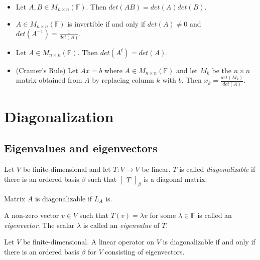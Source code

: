\documentclass[12pt]{article}
\newenvironment{theorem}[2][Theorem]{\begin{trivlist}
\item[\hskip \labelsep {\bfseries #1}\hskip \labelsep {\bfseries #2.}]}{\end{trivlist}}
\newenvironment{definition}[2][Definition]{\begin{trivlist}
\item[\hskip \labelsep {\bfseries #1}\hskip \labelsep {\bfseries #2}]}{\end{trivlist}}
\begin{document}
\begin{itemize}
    \item Let $A, B \in M_{n \times n}(\mathbb{F})$. Then $det(AB) = det(A)det(B)$. 
    
    \item $A \in M_{n \times n}(\mathbb{F})$ is invertible if and only if $det(A) \neq 0$ and $det(A^{-1}) = \frac{1}{det(A)}$.
    
    \item Let $A \in M_{n \times n}(\mathbb{F})$. Then $det(A^t) = det(A)$.
    
    \item (Cramer's Rule) Let $Ax = b$ where $A \in M_{n \times n}(\mathbb{F})$ and let $M_k$ be the $n \times n$ matrix obtained from $A$ by replacing column $k$ with $b$. Then $x_k = \frac{det(M_k)}{det(A)}$.
\end{itemize}

\section{Diagonalization}

\subsection{Eigenvalues and eigenvectors}

\begin{definition}{1}
Let $V$ be finite-dimensional and let $T : V \to V$ be linear. $T$ is called \textit{diagonalizable} if there is an ordered basis $\beta$ such that $\begin{bmatrix} T \end{bmatrix}_\beta$ is a diagonal matrix.
\end{definition}

\noindent Matrix $A$ is diagonalizable if $L_A$ is.

\begin{definition}{2}
A non-zero vector $v \in V$ such that $T(v) = \lambda v$ for some $\lambda \in \mathbb{F}$ is called an \textit{eigenvector}. The scalar $\lambda$ is called an \textit{eigenvalue} of $T$.
\end{definition}

\begin{theorem}{5.1}
Let $V$ be finite-dimensional. A linear operator on $V$ is diagonalizable if and only if there is an ordered basis $\beta$ for $V$ consisting of eigenvectors.
\end{theorem}
\end{document}
